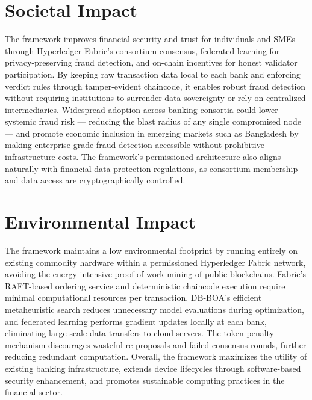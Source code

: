 \section{Societal Impact}
The framework improves financial security and trust for individuals and SMEs through Hyperledger Fabric's consortium consensus, federated learning for privacy-preserving fraud detection, and on-chain incentives for honest validator participation. By keeping raw transaction data local to each bank and enforcing verdict rules through tamper-evident chaincode, it enables robust fraud detection without requiring institutions to surrender data sovereignty or rely on centralized intermediaries. Widespread adoption across banking consortia could lower systemic fraud risk — reducing the blast radius of any single compromised node — and promote economic inclusion in emerging markets such as Bangladesh by making enterprise-grade fraud detection accessible without prohibitive infrastructure costs. The framework's permissioned architecture also aligns naturally with financial data protection regulations, as consortium membership and data access are cryptographically controlled.

\section{Environmental Impact}
The framework maintains a low environmental footprint by running entirely on existing commodity hardware within a permissioned Hyperledger Fabric network, avoiding the energy-intensive proof-of-work mining of public blockchains. Fabric's RAFT-based ordering service and deterministic chaincode execution require minimal computational resources per transaction. DB-BOA's efficient metaheuristic search reduces unnecessary model evaluations during optimization, and federated learning performs gradient updates locally at each bank, eliminating large-scale data transfers to cloud servers. The token penalty mechanism discourages wasteful re-proposals and failed consensus rounds, further reducing redundant computation. Overall, the framework maximizes the utility of existing banking infrastructure, extends device lifecycles through software-based security enhancement, and promotes sustainable computing practices in the financial sector.

